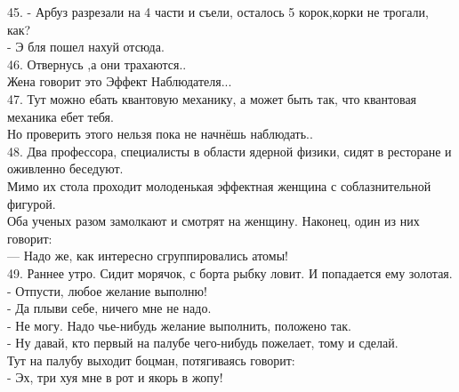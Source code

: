 \documentclass[a4paper,20pt,notitlepage]{extbook}
\begin{document}
	45. - Арбуз разрезали на 4 части и съели, осталось 5 корок,корки не трогали, как?\\
	 - Э бля пошел нахуй отсюда.\\
	 
	46. Отвернусь ,а они трахаются..\\
	Жена говорит это Эффект Наблюдателя...\\
	
	47. Тут можно ебать квантовую механику, а может быть так, что квантовая механика ебет тебя. \\
	Но проверить этого нельзя пока не начнёшь наблюдать..\\
	
	48. Два профессора, специалисты в области ядерной физики, сидят в ресторане и оживленно беседуют. \\
	Мимо их стола проходит молоденькая эффектная женщина с соблазнительной фигурой. \\
	Оба ученых разом замолкают и смотрят на женщину. Наконец, один из них говорит:\\
	 — Надо же, как интересно сгруппировались атомы!\\
	 
	49. Раннее утро. Сидит морячок, с борта рыбку ловит. И попадается ему золотая.\\
	- Отпусти, любое желание выполню!\\
	- Да плыви себе, ничего мне не надо.\\
	- Не могу. Надо чье-нибудь желание выполнить, положено так.\\
	- Ну давай, кто первый на палубе чего-нибудь пожелает, тому и сделай.\\
	Тут на палубу выходит боцман, потягиваясь говорит:\\
	- Эх, три хуя мне в рот и якорь в жопу!\\
	
\end{document}
